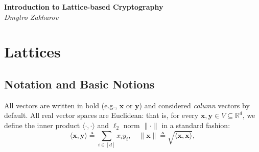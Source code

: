 \documentclass{template}
\begin{document}
\begin{center}
    \Large\textcolor{blue!70!black}{\textbf{Introduction to Lattice-based Cryptography}} \\
    \normalsize\textit{Dmytro Zakharov}
\end{center}

\begin{abstract}
    In recent years, the interest in lattice-based cryptography has been
    steadily increasing. One primary reason is, of course, that problems related
    to lattices and their derivatives are widely believed to be \textit{hard
    even for quantum computers}. Furthermore, there are settings where the
    algebraic structure of lattices is natural: e.g., for fully-homomorphic
    encryption.

    This brief paper is a technical introduction to lattice-based cryptography.
    We give formal definitions of lattices and introduce key related hardness
    assumptions such as SVP, CVP, and several variants of LWE. We show how to
    build public-key encryption (PKE) and digital signature schemes based on LWE
    assumptions and partially prove the security of key constructions. Finally,
    we provide a high-level specification of Kyber PKE and Dilithium signature
    schemes.
    
    We aim to make these notes accessible while preserving rigorousness where
    appropriate. Basic knowledge of cryptography and algebra is required.
\end{abstract}

\tableofcontents

\newpage

\section{Lattices}\label{section:lattices}

\subsection*{Notation and Basic Notions}

All vectors are written in bold (e.g., $\mathbf{x}$ or $\mathbf{y}$) and
considered \textit{column} vectors by default. All real vector spaces are
Euclidean: that is, for every $\mathbf{x}, \mathbf{y} \in V \subseteq
\mathbb{R}^d$, we define the inner product $\langle \cdot, \cdot \rangle$ and
$\ell_2$ norm $\|\cdot\|$ in a standard fashion:
\begin{equation*}
    \langle \mathbf{x}, \mathbf{y} \rangle \triangleq \sum_{i \in [d]} x_iy_i, \quad \|\mathbf{x}\| \triangleq \sqrt{\langle \mathbf{x}, \mathbf{x} \rangle},
\end{equation*}
\end{document}
